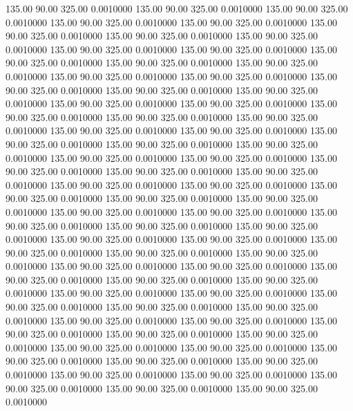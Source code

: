  135.00   90.00  325.00   0.0010000
 135.00   90.00  325.00   0.0010000
 135.00   90.00  325.00   0.0010000
 135.00   90.00  325.00   0.0010000
 135.00   90.00  325.00   0.0010000
 135.00   90.00  325.00   0.0010000
 135.00   90.00  325.00   0.0010000
 135.00   90.00  325.00   0.0010000
 135.00   90.00  325.00   0.0010000
 135.00   90.00  325.00   0.0010000
 135.00   90.00  325.00   0.0010000
 135.00   90.00  325.00   0.0010000
 135.00   90.00  325.00   0.0010000
 135.00   90.00  325.00   0.0010000
 135.00   90.00  325.00   0.0010000
 135.00   90.00  325.00   0.0010000
 135.00   90.00  325.00   0.0010000
 135.00   90.00  325.00   0.0010000
 135.00   90.00  325.00   0.0010000
 135.00   90.00  325.00   0.0010000
 135.00   90.00  325.00   0.0010000
 135.00   90.00  325.00   0.0010000
 135.00   90.00  325.00   0.0010000
 135.00   90.00  325.00   0.0010000
 135.00   90.00  325.00   0.0010000
 135.00   90.00  325.00   0.0010000
 135.00   90.00  325.00   0.0010000
 135.00   90.00  325.00   0.0010000
 135.00   90.00  325.00   0.0010000
 135.00   90.00  325.00   0.0010000
 135.00   90.00  325.00   0.0010000
 135.00   90.00  325.00   0.0010000
 135.00   90.00  325.00   0.0010000
 135.00   90.00  325.00   0.0010000
 135.00   90.00  325.00   0.0010000
 135.00   90.00  325.00   0.0010000
 135.00   90.00  325.00   0.0010000
 135.00   90.00  325.00   0.0010000
 135.00   90.00  325.00   0.0010000
 135.00   90.00  325.00   0.0010000
 135.00   90.00  325.00   0.0010000
 135.00   90.00  325.00   0.0010000
 135.00   90.00  325.00   0.0010000
 135.00   90.00  325.00   0.0010000
 135.00   90.00  325.00   0.0010000
 135.00   90.00  325.00   0.0010000
 135.00   90.00  325.00   0.0010000
 135.00   90.00  325.00   0.0010000
 135.00   90.00  325.00   0.0010000
 135.00   90.00  325.00   0.0010000
 135.00   90.00  325.00   0.0010000
 135.00   90.00  325.00   0.0010000
 135.00   90.00  325.00   0.0010000
 135.00   90.00  325.00   0.0010000
 135.00   90.00  325.00   0.0010000
 135.00   90.00  325.00   0.0010000
 135.00   90.00  325.00   0.0010000
 135.00   90.00  325.00   0.0010000
 135.00   90.00  325.00   0.0010000
 135.00   90.00  325.00   0.0010000
 135.00   90.00  325.00   0.0010000
 135.00   90.00  325.00   0.0010000
 135.00   90.00  325.00   0.0010000
 135.00   90.00  325.00   0.0010000
 135.00   90.00  325.00   0.0010000
 135.00   90.00  325.00   0.0010000
 135.00   90.00  325.00   0.0010000
 135.00   90.00  325.00   0.0010000
 135.00   90.00  325.00   0.0010000
 135.00   90.00  325.00   0.0010000
 135.00   90.00  325.00   0.0010000
 135.00   90.00  325.00   0.0010000
 135.00   90.00  325.00   0.0010000
